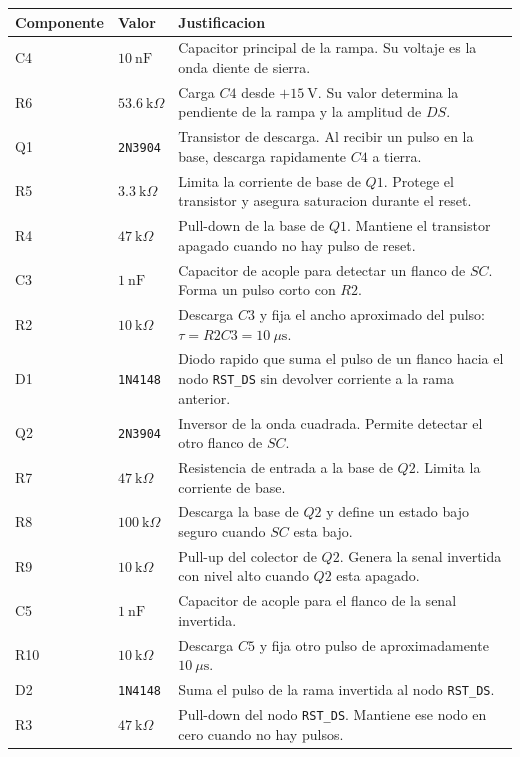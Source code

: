 ﻿\documentclass[11pt,letterpaper]{article}
\newcommand{\kohm}{\text{k}\Omega}
\begin{document}
\begin{longtable}{p{2.0cm}p{4.2cm}p{8.7cm}}
\toprule
Componente & Valor & Justificacion \\
\midrule
\endhead
C4 & \(10~\text{nF}\) & Capacitor principal de la rampa. Su voltaje es la onda
diente de sierra. \\
R6 & \(53.6~\kohm\) & Carga \(C4\) desde \(+15~\text{V}\). Su valor determina
la pendiente de la rampa y la amplitud de \(DS\). \\
Q1 & \texttt{2N3904} & Transistor de descarga. Al recibir un pulso en la base,
descarga rapidamente \(C4\) a tierra. \\
R5 & \(3.3~\kohm\) & Limita la corriente de base de \(Q1\). Protege el
transistor y asegura saturacion durante el reset. \\
R4 & \(47~\kohm\) & Pull-down de la base de \(Q1\). Mantiene el transistor
apagado cuando no hay pulso de reset. \\
C3 & \(1~\text{nF}\) & Capacitor de acople para detectar un flanco de \(SC\).
Forma un pulso corto con \(R2\). \\
R2 & \(10~\kohm\) & Descarga \(C3\) y fija el ancho aproximado del pulso:
\(\tau=R2C3=10~\mu\text{s}\). \\
D1 & \texttt{1N4148} & Diodo rapido que suma el pulso de un flanco hacia el
nodo \texttt{RST\_DS} sin devolver corriente a la rama anterior. \\
Q2 & \texttt{2N3904} & Inversor de la onda cuadrada. Permite detectar el otro
flanco de \(SC\). \\
R7 & \(47~\kohm\) & Resistencia de entrada a la base de \(Q2\). Limita la
corriente de base. \\
R8 & \(100~\kohm\) & Descarga la base de \(Q2\) y define un estado bajo
seguro cuando \(SC\) esta bajo. \\
R9 & \(10~\kohm\) & Pull-up del colector de \(Q2\). Genera la senal invertida
con nivel alto cuando \(Q2\) esta apagado. \\
C5 & \(1~\text{nF}\) & Capacitor de acople para el flanco de la senal
invertida. \\
R10 & \(10~\kohm\) & Descarga \(C5\) y fija otro pulso de aproximadamente
\(10~\mu\text{s}\). \\
D2 & \texttt{1N4148} & Suma el pulso de la rama invertida al nodo
\texttt{RST\_DS}. \\
R3 & \(47~\kohm\) & Pull-down del nodo \texttt{RST\_DS}. Mantiene ese nodo
en cero cuando no hay pulsos. \\
\bottomrule
\end{longtable}
\end{document}
